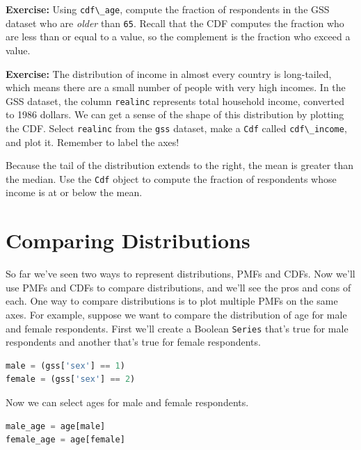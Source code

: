 \textbf{Exercise:} Using \passthrough{\lstinline!cdf\_age!}, compute the
fraction of respondents in the GSS dataset who are \emph{older} than
\passthrough{\lstinline!65!}. Recall that the CDF computes the fraction
who are less than or equal to a value, so the complement is the fraction
who exceed a value.

\textbf{Exercise:} The distribution of income in almost every country is
long-tailed, which means there are a small number of people with very
high incomes. In the GSS dataset, the column
\passthrough{\lstinline!realinc!} represents total household income,
converted to 1986 dollars. We can get a sense of the shape of this
distribution by plotting the CDF. Select
\passthrough{\lstinline!realinc!} from the \passthrough{\lstinline!gss!}
dataset, make a \passthrough{\lstinline!Cdf!} called
\passthrough{\lstinline!cdf\_income!}, and plot it. Remember to label
the axes!

Because the tail of the distribution extends to the right, the mean is
greater than the median. Use the \passthrough{\lstinline!Cdf!} object to
compute the fraction of respondents whose income is at or below the
mean.

\hypertarget{comparing-distributions}{%
\section{Comparing Distributions}\label{comparing-distributions}}

So far we've seen two ways to represent distributions, PMFs and CDFs.
Now we'll use PMFs and CDFs to compare distributions, and we'll see the
pros and cons of each. One way to compare distributions is to plot
multiple PMFs on the same axes. For example, suppose we want to compare
the distribution of age for male and female respondents. First we'll
create a Boolean \passthrough{\lstinline!Series!} that's true for male
respondents and another that's true for female respondents.

\begin{lstlisting}[language=Python,style=source]
male = (gss['sex'] == 1)
female = (gss['sex'] == 2)
\end{lstlisting}

Now we can select ages for male and female respondents.

\begin{lstlisting}[language=Python,style=source]
male_age = age[male]
female_age = age[female]
\end{lstlisting}

